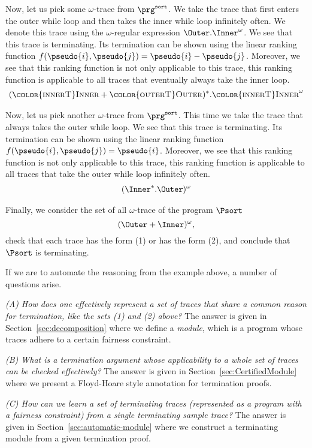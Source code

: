Now, let us pick some $\omega$-trace from $\prg^\texttt{sort}$.  
We take the trace that first enters the outer while loop and then takes the inner while loop infinitely often.  
We denote this trace using the $\omega$-regular expression $\Outer. \Inner^\omega$.  
We see that this trace is terminating. Its termination can be shown using the linear ranking function $f(\pseudo{i},\pseudo{j})=\pseudo{i}-\pseudo{j}$.  
Moreover, we see that this ranking function is not only applicable to this trace, this ranking function is applicable to all traces that eventually always take the inner loop.
\begin{align}
(\textsc{\color{innerT}Inner}+\textsc{\color{outerT}Outer})^*. \textsc{\color{innerT}Inner}^\omega 
\end{align}

Now, let us pick another $\omega$-trace from $\prg^\texttt{sort}$.  
This time we take the trace that always takes the outer while loop. We see that this trace is terminating. Its termination can be shown using the linear ranking function $f(\pseudo{i},\pseudo{j})=\pseudo{i}$.  
Moreover, we see that this ranking function is not only applicable to this trace, this ranking function is applicable to all traces that take the outer while loop infinitely often.
\begin{align}
(\Inner^*.\Outer)^\omega
\end{align}

Finally, we consider the set of all $\omega$-trace of the program $\Psort$
$$(\Outer + \Inner)^\omega,$$
check that each trace has the form (1) or has the form (2), and conclude that $\Psort$ is terminating.


If we are to automate the reasoning from 
the example above, a number of questions arise. 

\emph{(A) How does one effectively represent a set of traces that share a common reason for termination, like the sets (1) and (2) above?}
The answer is given in Section~\ref{sec:decomposition} where we define a \emph{module}, which is a program whose traces adhere to a certain fairness constraint.

\emph{(B) What is a termination argument whose applicability to a whole set of traces can be checked effectively?}
The answer is given in Section~\ref{sec:CertifiedModule} where we present a Floyd-Hoare style annotation for termination proofs.

\emph{(C) How can we learn a set of terminating traces (represented as a program with a fairness constraint) from a single terminating sample trace?}
The answer is given in Section~\ref{sec:automatic-module} where we construct a terminating module from a given termination proof.

